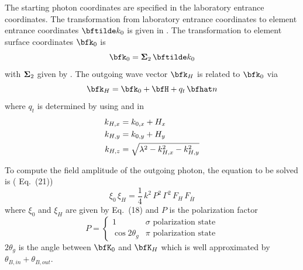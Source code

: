 The starting photon coordinates are specified in the laboratory entrance coordinates. The
transformation from laboratory entrance coordinates to element entrance coordinates $\bftilde k_0$
is given in . The transformation to element surface coordinates $\bfk_0$ is
\begin{equation}
  \bfk_0 =  \Bf\Sigma_2 \, \bftilde k_0
\end{equation}
with ${\bf \Sigma}_2$ given by .
The outgoing wave vector $\bfk_H$ is related to $\bfk_0$ via
\begin{equation}
  \bfk_H =  \bfk_0 + \bfH + q_t \, \bfhat n
\end{equation}
where $q_t$ is determined by using  and  in 
\begin{align}
  k_{H,x} &= k_{0,x} + H_x \nonumber \nonumber \\
  k_{H,y} &= k_{0,y} + H_y \\
  k_{H,z} &= \sqrt{\lambda^2 - k_{H,x}^2 - k_{H,y}^2} \nonumber
\end{align}

To compute the field amplitude of the outgoing photon, the equation to be solved is
(\cite{b:batterman} Eq.~(21))
\begin{equation}
  \xi_0 \, \xi_H = \frac{1}{4} \, k^2 \, P^2 \, \Gamma^2 \, F_H \, F_{\bar H}
  \label{xx14}
\end{equation}
where $\xi_0$ and $\xi_H$ are given by \cite{b:batterman} Eq.~(18) and $P$ is the polarization
factor
\begin{equation}
  P = 
  \begin{cases}
    1               & \sigma \text{ polarization state} \\
    \cos 2\theta_g  & \pi \text{ polarization state}
  \end{cases}
\end{equation}
$2\theta_g$ is the angle between $\bfK_0$ and $\bfK_H$ which is well
approximated by $\theta_{B,in} + \theta_{B,out}$.


